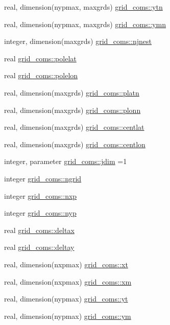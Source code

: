 \begin{DoxyCompactItemize}
\item 
real, dimension(nypmax, maxgrds) \hyperlink{namespacegrid__coms_aa853f8064bf96a5159ba89902bf37efb}{grid\+\_\+coms\+::ytn}
\item 
real, dimension(nypmax, maxgrds) \hyperlink{namespacegrid__coms_ac86adbc4cb710451d5b9ae53178a756b}{grid\+\_\+coms\+::ymn}
\item 
integer, dimension(maxgrds) \hyperlink{namespacegrid__coms_a98e39448e926de9a2fa2de1ad700e7ae}{grid\+\_\+coms\+::njnest}
\item 
real \hyperlink{namespacegrid__coms_a332ff2495f60062e9fa9f90035dc8cd3}{grid\+\_\+coms\+::polelat}
\item 
real \hyperlink{namespacegrid__coms_ad1ae0e93c1ba39b88b6e957547176e8a}{grid\+\_\+coms\+::polelon}
\item 
real, dimension(maxgrds) \hyperlink{namespacegrid__coms_adeea6f966fb6ad97de70d6d4f27e273c}{grid\+\_\+coms\+::platn}
\item 
real, dimension(maxgrds) \hyperlink{namespacegrid__coms_aeb6e6ef8eced0c1e67af7b80cead352c}{grid\+\_\+coms\+::plonn}
\item 
real, dimension(maxgrds) \hyperlink{namespacegrid__coms_a88baeaebc7ead79b3b400cfa34392384}{grid\+\_\+coms\+::centlat}
\item 
real, dimension(maxgrds) \hyperlink{namespacegrid__coms_a249d1ce34222c741969c77af125d21ba}{grid\+\_\+coms\+::centlon}
\item 
integer, parameter \hyperlink{namespacegrid__coms_ae52c617003c61ec2de61c4615fd9c707}{grid\+\_\+coms\+::jdim} =1
\item 
integer \hyperlink{namespacegrid__coms_a40741410645b943eedf06a7c11a6197d}{grid\+\_\+coms\+::ngrid}
\item 
integer \hyperlink{namespacegrid__coms_aff2c702052cc543c317c4feea0dbb76a}{grid\+\_\+coms\+::nxp}
\item 
integer \hyperlink{namespacegrid__coms_af5bde1fabbca5ebe3e44f565781fc950}{grid\+\_\+coms\+::nyp}
\item 
real \hyperlink{namespacegrid__coms_aefac306f17fd9da10ae08206490c1d96}{grid\+\_\+coms\+::deltax}
\item 
real \hyperlink{namespacegrid__coms_a80d44caaab6b380ba782f2e41e9c00a8}{grid\+\_\+coms\+::deltay}
\item 
real, dimension(nxpmax) \hyperlink{namespacegrid__coms_ab408e5eee5cb44c67ad1321c400c71ec}{grid\+\_\+coms\+::xt}
\item 
real, dimension(nxpmax) \hyperlink{namespacegrid__coms_afa5dc0abd71433f8c1e1e42ed0f3f485}{grid\+\_\+coms\+::xm}
\item 
real, dimension(nypmax) \hyperlink{namespacegrid__coms_a24ff2ae7949aa76dc0d798ef5baa5aab}{grid\+\_\+coms\+::yt}
\item 
real, dimension(nypmax) \hyperlink{namespacegrid__coms_a4e0c01da9f5b650af168d526fc6161e6}{grid\+\_\+coms\+::ym}
\end{DoxyCompactItemize}
